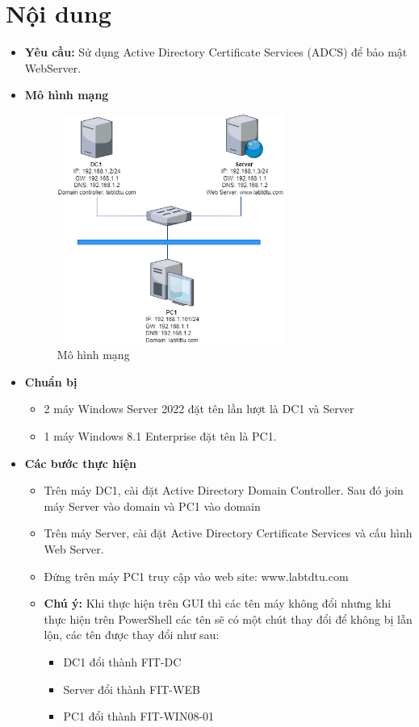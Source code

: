 \documentclass[13pt]{report}
\begin{document}
	\section{Nội dung}
	\begin{itemize}
		\item \textbf{Yêu cầu:} Sử dụng Active Directory Certificate Services (ADCS) để bảo mật WebServer.
		\item \textbf{Mô hình mạng}
		\begin{figure}[htp]
			\centering
			\includegraphics[width=0.7\textwidth]{image/mohinh.png}
			\caption{Mô hình mạng}
			\label{refhinh1}
		\end{figure}
		\item \textbf{Chuẩn bị}
		\begin{itemize}
			\item 2 máy Windows Server 2022 đặt tên lần lượt là DC1 và Server
			\item 1 máy Windows 8.1 Enterprise đặt tên là PC1.
		\end{itemize}
		\item \textbf{Các bước thực hiện}
		\begin{itemize}
			\item Trên máy DC1, cài đặt Active Directory Domain Controller. Sau đó join máy Server vào domain và PC1 vào domain
			\item Trên máy Server, cài đặt Active Directory Certificate Services và cấu hình Web Server.
			\item Đứng trên máy PC1 truy cập vào web site: www.labtdtu.com
			\item \textbf{Chú ý:} Khi thực hiện trên GUI thì các tên máy không đổi nhưng khi thực hiện trên PowerShell các tên sẽ có một chút thay đổi để không bị lẫn lộn, các tên được thay đổi như sau:
			\begin{itemize}
				\item DC1 đổi thành FIT-DC
				\item Server đổi thành FIT-WEB
				\item PC1 đổi thành FIT-WIN08-01
			\end{itemize}
		\end{itemize}
	\end{itemize}
	\newpage
\end{document}
